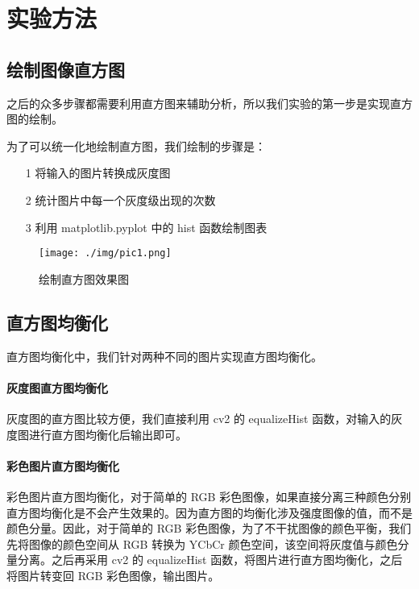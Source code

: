 \documentclass[11pt]{ctexart}
\begin{document}
\section{实验方法}

\subsection{绘制图像直方图}

之后的众多步骤都需要利用直方图来辅助分析，所以我们实验的第一步是实现直方图的绘制。

为了可以统一化地绘制直方图，我们绘制的步骤是：

\begin{itemize}
    \item [1] 将输入的图片转换成灰度图
    \item [2] 统计图片中每一个灰度级出现的次数
    \item [3] 利用 matplotlib.pyplot 中的 hist 函数绘制图表
\end{itemize}

  \begin{figure}[htbp]
        \centering
        \texttt{[image: ./img/pic1.png]}
        \caption{绘制直方图效果图}\label{fig:digit}
  \end{figure}

\subsection{直方图均衡化}

直方图均衡化中，我们针对两种不同的图片实现直方图均衡化。

\paragraph{灰度图直方图均衡化}

灰度图的直方图比较方便，我们直接利用 cv2 的 equalizeHist 函数，对输入的灰度图进行直方图均衡化后输出即可。

\paragraph{彩色图片直方图均衡化}

彩色图片直方图均衡化，对于简单的 RGB 彩色图像，如果直接分离三种颜色分别直方图均衡化是不会产生效果的。因为直方图的均衡化涉及强度图像的值，而不是颜色分量。因此，对于简单的 RGB 彩色图像，为了不干扰图像的颜色平衡，我们先将图像的颜色空间从 RGB 转换为 YCbCr 颜色空间，该空间将灰度值与颜色分量分离。之后再采用 cv2 的 equalizeHist 函数，将图片进行直方图均衡化，之后将图片转变回 RGB 彩色图像，输出图片。
\end{document}
